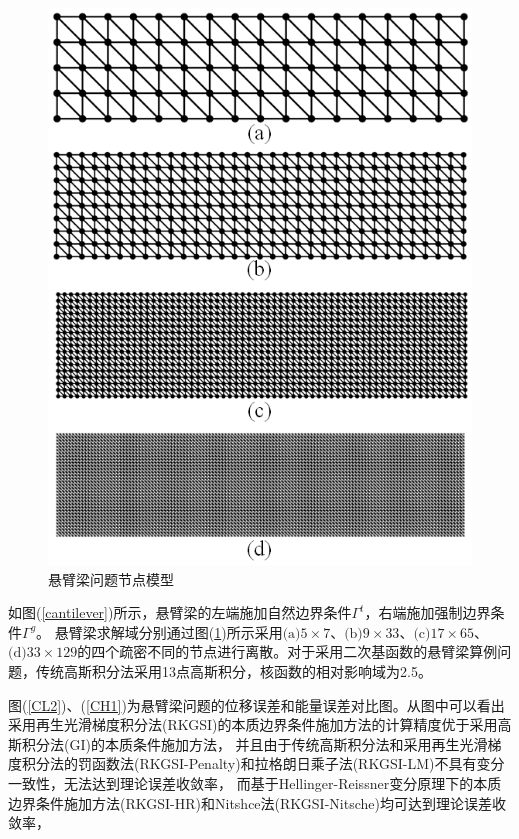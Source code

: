\begin{figure}[!h]
    \centering
    \includegraphics[scale=0.7]{figure/cantilever/cantilever.mesh.png}
    \caption{悬臂梁问题节点模型}\label{cantilever.mesh}
\end{figure}\newpage
如图(\ref{cantilever})所示，悬臂梁的左端施加自然边界条件$\Gamma^t$，右端施加强制边界条件$\Gamma^g$。
悬臂梁求解域分别通过图(\ref{cantilever.mesh})所示采用$\text{(a)}5\times7$、$\text{(b)}9\times33$、$\text{(c)}17\times65$、$\text{(d)}33\times129$的四个疏密不同的节点进行离散。对于采用二次基函数的悬臂梁算例问题，传统高斯积分法采用13点高斯积分，核函数的相对影响域为2.5。\par
图(\ref{CL2})、(\ref{CH1})为悬臂梁问题的位移误差和能量误差对比图。从图中可以看出采用再生光滑梯度积分法(RKGSI)的本质边界条件施加方法的计算精度优于采用高斯积分法(GI)的本质条件施加方法，
并且由于传统高斯积分法和采用再生光滑梯度积分法的罚函数法(RKGSI-Penalty)和拉格朗日乘子法(RKGSI-LM)不具有变分一致性，无法达到理论误差收敛率，
而基于Hellinger-Reissner变分原理下的本质边界条件施加方法(RKGSI-HR)和Nitshce法(RKGSI-Nitsche)均可达到理论误差收敛率，
